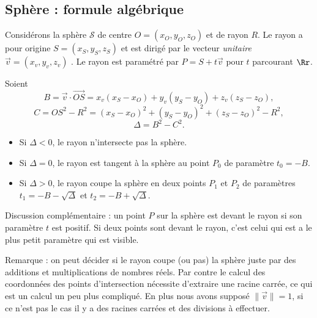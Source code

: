 \documentclass[11pt,class=report,crop=false]{standalone}
\begin{document}
\subsection{Sphère : formule algébrique}

Considérons la sphère $\mathcal{S}$ de centre $O = (x_O,y_O,z_O)$ et de rayon $R$.
Le rayon a pour origine $S = (x_S,y_S,z_S)$ et est dirigé par le vecteur \emph{unitaire} $\vec v = (x_v,y_v,z_v)$ .
Le rayon est paramétré par $P =  S + t \vec v$ pour $t$ parcourant $\Rr$.

\begin{proposition}
Soient 
$$B = \vec{v} \cdot \overrightarrow{OS} = x_v(x_S-x_O) + y_v(y_S-y_O) + z_v(z_S-z_O),$$
$$C = OS^2 - R^2 = (x_S-x_O)^2 + (y_S-y_O)^2 + (z_S-z_O)^2 - R^2,$$
$$\Delta = B^2 - C^2.$$

\begin{itemize}
  \item Si $\Delta < 0$, le rayon n'intersecte pas la sphère.
  \item Si $\Delta = 0$, le rayon est tangent à la sphère au point $P_0$ de paramètre $t_0=-B$.
  \item Si $\Delta>0$, le rayon coupe la sphère en deux points $P_1$ et $P_2$ de paramètres $t_1 = -B - \sqrt{\Delta}$ et $t_2 = -B + \sqrt{\Delta}$.
\end{itemize}
\end{proposition}

Discussion complémentaire : un point $P$ sur la sphère est \og{}devant\fg{} le rayon si son paramètre $t$ est positif.
Si deux points sont devant le rayon, c'est celui qui est a le plus petit paramètre qui est visible.

\begin{center}
	\begin{minipage}{0.45\textwidth}
	\end{minipage}\qquad
	\begin{minipage}{0.45\textwidth}
	\end{minipage}
\end{center}


Remarque : on peut décider si le rayon coupe (ou pas) la sphère juste par des additions et multiplications de nombres réels. Par contre le calcul des coordonnées des points d'intersection nécessite d'extraire une racine carrée, ce qui est un calcul un peu plus compliqué. En plus nous avons supposé $\|\vec v\|=1$, si ce n'est pas le cas il y a des racines carrées et des divisions à effectuer.
\end{document}
